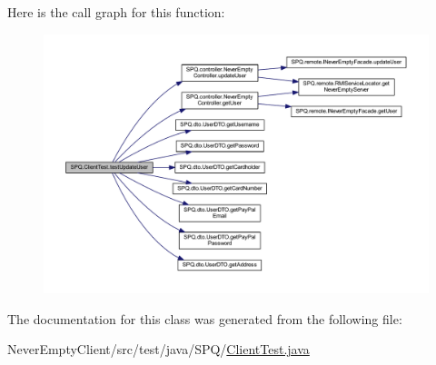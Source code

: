 Here is the call graph for this function\+:
\nopagebreak
\begin{figure}[H]
\begin{center}
\leavevmode
\includegraphics[width=350pt]{class_s_p_q_1_1_client_test_ab6d14403cd66b3b0ab32f8022902588f_cgraph}
\end{center}
\end{figure}


The documentation for this class was generated from the following file\+:\begin{DoxyCompactItemize}
\item 
Never\+Empty\+Client/src/test/java/\+S\+P\+Q/\mbox{\hyperlink{_client_test_8java}{Client\+Test.\+java}}\end{DoxyCompactItemize}
